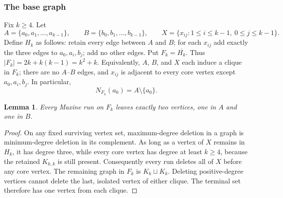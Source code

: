 \documentclass[11pt,a4paper]{article}
\newtheorem{lemma}[theorem]{Lemma}
\theoremstyle{definition}\newtheorem{definition}[theorem]{Definition}
\theoremstyle{remark}\newtheorem{remark}[theorem]{Remark}
\begin{document}
\subsubsection{The base graph}
Fix $k\geq4$. Let
\[
 A=\{a_0,a_1,\ldots,a_{k-1}\},\qquad
 B=\{b_0,b_1,\ldots,b_{k-1}\},\qquad
 X=\{x_{ij}:1\leq i\leq k-1,\ 0\leq j\leq k-1\}.
\]
Define $H_k$ as follows: retain every edge between $A$ and $B$;
for each $x_{ij}$ add exactly the three edges to $a_0,a_i,b_j$;
add no other edges. Put $F_k=\overline{H_k}$. Thus
$|F_k|=2k+k(k-1)=k^2+k$.
Equivalently, $A$, $B$, and $X$ each induce a clique in $F_k$;
there are no $A$--$B$ edges, and $x_{ij}$ is adjacent to every core
vertex except $a_0,a_i,b_j$. In particular,
\begin{equation}\label{late:382e:eq:special}
 N_{F_k}(a_0)=A\setminus\{a_0\}.
\end{equation}

\begin{lemma}\label{late:382e:lem:maxine}
Every Maxine run on $F_k$ leaves exactly two vertices, one in $A$ and one in $B$.
\end{lemma}
\begin{proof}
On any fixed surviving vertex set, maximum-degree deletion in a graph
is minimum-degree deletion in its complement. As long as a vertex of
$X$ remains in $H_k$, it has degree three, while every core vertex
has degree at least $k\geq4$, because the retained $K_{k,k}$ is still
present. Consequently every run deletes all of $X$ before any core
vertex. The remaining graph in $F_k$ is $K_k\sqcup K_k$.
Deleting positive-degree vertices cannot delete the last, isolated
vertex of either clique. The terminal set therefore has one vertex
from each clique.
\end{proof}
\end{document}
